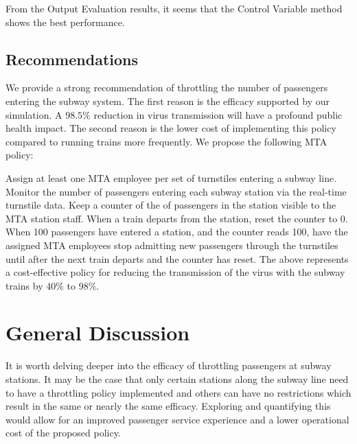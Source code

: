\documentclass[12pt]{article}
\begin{document}
From the Output Evaluation results, it seems that the Control Variable method shows the best performance.

\subsection {Recommendations}

We provide a strong recommendation of throttling the number of passengers entering the subway system. The first reason is the efficacy supported by our simulation. A $98.5\%$ reduction in virus transmission will have a profound public health impact. The second reason is the lower cost of implementing this policy compared to running trains more frequently. We propose the following MTA policy:

\begin{displayquote}
	Assign at least one MTA employee per set of turnstiles entering a subway line.
	Monitor the number of passengers entering each subway station via the real-time turnstile data.
	Keep a counter of the of passengers in the station visible to the MTA station staff.
	When a train departs from the station, reset the counter to 0.
	When 100 passengers have entered a station, and the counter reads 100, have the assigned MTA employees stop admitting new passengers through the turnstiles until after the next train departs and the counter has reset.
	The above represents a cost-effective policy for reducing the transmission of the virus with the subway trains by 40\% to 98\%.
\end{displayquote}

\section{General Discussion}

It is worth delving deeper into the efficacy of throttling passengers at subway stations.
It may be the case that only certain stations along the subway line need to have a throttling policy implemented and others can have no restrictions which result in the same or nearly the same efficacy.
Exploring and quantifying this would allow for an improved passenger service experience and a lower operational cost of the proposed policy.
\end{document}
